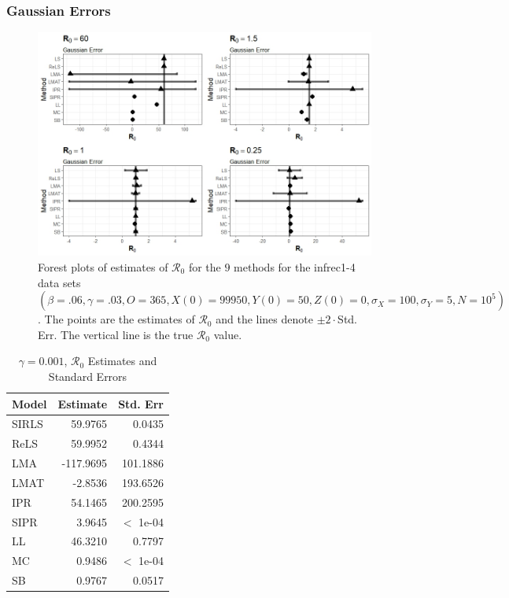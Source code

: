 \documentclass[12pt]{article}
\newcommand{\xxsir}{\ensuremath{9} } %
\newcommand{\rr}{\ensuremath{\mathcal{R}_0}}
\begin{document}
\subsubsection{Gaussian Errors}

\begin{figure}[H]
  \centering
  \includegraphics[scale=0.5]{images/parchange_n.jpeg}
  \caption{Forest plots of estimates of $\rr$ for the \xxsir methods for the infrec1-4 data sets $(\beta=.06, \gamma=.03, O=365, X(0)=99950, Y(0)=50, Z(0)=0, \sigma_X=100, \sigma_Y=5, N=10^5)$.  The points are the estimates of $\rr$ and the lines denote $\pm 2\cdot $Std. Err.  The vertical line is the true $\rr$ value.}
  \label{fig:infrec1-res}
\end{figure}
\begin{table}[H]

	\centering
	\begin{tabular}[t]{l|r|r}
		\hline
		Model & Estimate & Std. Err\\
		\hline
		SIRLS & 59.9765 & 0.0435\\
		\hline
		ReLS & 59.9952 & 0.4344\\
		\hline
		LMA &  -117.9695 & 101.1886 \\
		\hline
		LMAT & -2.8536 & 193.6526 \\
		\hline
		IPR & 54.1465 & 200.2595\\
		\hline
		SIPR & 3.9645 & $<$ 1e-04\\
		\hline
		LL & 46.3210 & 0.7797\\
		\hline
		MC & 0.9486 & $<$ 1e-04 \\
		\hline
		SB & 0.9767 & 0.0517\\
		\hline
	\end{tabular}
        \caption{\label{tab:infrec1-res}$\gamma = 0.001$, $\rr$ Estimates and Standard Errors}
\end{table}
\end{document}

